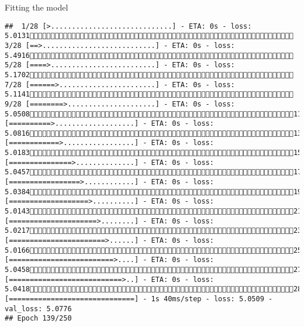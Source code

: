 \documentclass[
  ignorenonframetext,
]{beamer}
\begin{document}
\begin{frame}[fragile]{Fitting the model}
\begin{verbatim}
##  1/28 [>.............................] - ETA: 0s - loss: 5.0131 3/28 [==>...........................] - ETA: 0s - loss: 5.4916 5/28 [====>.........................] - ETA: 0s - loss: 5.1702 7/28 [======>.......................] - ETA: 0s - loss: 5.1141 9/28 [========>.....................] - ETA: 0s - loss: 5.050811/28 [==========>...................] - ETA: 0s - loss: 5.081613/28 [============>.................] - ETA: 0s - loss: 5.018315/28 [===============>..............] - ETA: 0s - loss: 5.045717/28 [=================>............] - ETA: 0s - loss: 5.038419/28 [===================>..........] - ETA: 0s - loss: 5.014321/28 [=====================>........] - ETA: 0s - loss: 5.021723/28 [=======================>......] - ETA: 0s - loss: 5.016625/28 [=========================>....] - ETA: 0s - loss: 5.045827/28 [===========================>..] - ETA: 0s - loss: 5.041828/28 [==============================] - 1s 40ms/step - loss: 5.0509 - val_loss: 5.0776
## Epoch 139/250

\end{verbatim}
\end{frame}
\end{document}
